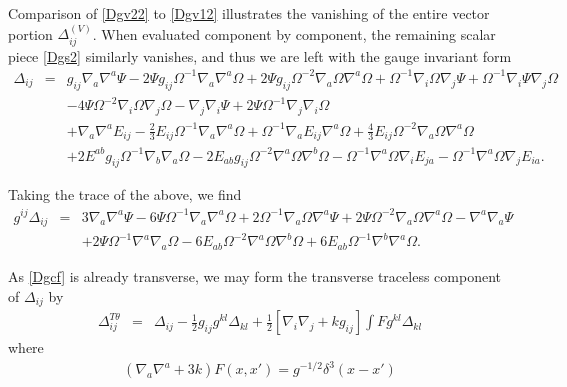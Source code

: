 \documentclass[10pt,letterpaper]{article}
\numberwithin{equation}{section}
\begin{document}
Comparison of \eqref{Dgv22} to \eqref{Dgv12} illustrates the vanishing of the entire vector portion $\Delta^{(V)}_{ij}$. When evaluated component by component, the remaining scalar piece \eqref{Dgs2} similarly vanishes, and thus we are left with the gauge invariant form
\begin{eqnarray}
\Delta_{ij}&=&g_{ij} \nabla_{a}\nabla^{a}\Psi
- 2 \Psi g_{ij} \Omega^{-1} \nabla_{a}\nabla^{a}\Omega
+ 2 \Psi g_{ij} \Omega^{-2} \nabla_{a}\Omega \nabla^{a}\Omega
+ \Omega^{-1} \nabla_{i}\Omega \nabla_{j}\Psi
+ \Omega^{-1} \nabla_{i}\Psi \nabla_{j}\Omega\nonumber\\
&& - 4 \Psi \Omega^{-2} \nabla_{i}\Omega \nabla_{j}\Omega
-  \nabla_{j}\nabla_{i}\Psi
+ 2 \Psi \Omega^{-1} \nabla_{j}\nabla_{i}\Omega
\nonumber\\
&&+\nabla_{a}\nabla^{a}E_{ij}
-  \tfrac{2}{3} E_{ij} \Omega^{-1} \nabla_{a}\nabla^{a}\Omega
+ \Omega^{-1} \nabla_{a}E_{ij} \nabla^{a}\Omega
+ \tfrac{4}{3} E_{ij} \Omega^{-2} \nabla_{a}\Omega \nabla^{a}\Omega\nonumber\\
&& + 2 E^{ab} g_{ij} \Omega^{-1} \nabla_{b}\nabla_{a}\Omega
- 2 E_{ab} g_{ij} \Omega^{-2} \nabla^{a}\Omega \nabla^{b}\Omega
-  \Omega^{-1} \nabla^{a}\Omega \nabla_{i}E_{ja}
-  \Omega^{-1} \nabla^{a}\Omega \nabla_{j}E_{ia}.
\label{Dgcf}
\end{eqnarray}

Taking the trace of the above, we find
\begin{eqnarray}
g^{ij}\Delta_{ij}&=&3 \nabla_{a}\nabla^{a}\Psi
- 6 \Psi \Omega^{-1} \nabla_{a}\nabla^{a}\Omega
+ 2 \Omega^{-1} \nabla_{a}\Omega \nabla^{a}\Psi
+ 2 \Psi \Omega^{-2} \nabla_{a}\Omega \nabla^{a}\Omega
-  \nabla^{a}\nabla_{a}\Psi\nonumber\\
&& + 2 \Psi \Omega^{-1} \nabla^{a}\nabla_{a}\Omega
- 6 E_{ab} \Omega^{-2} \nabla^{a}\Omega \nabla^{b}\Omega
+ 6 E_{ab} \Omega^{-1} \nabla^{b}\nabla^{a}\Omega.
\end{eqnarray}

As \eqref{Dgcf} is already transverse, we may form the transverse traceless component of $\Delta_{ij}$ by 
\begin{eqnarray}
 \Delta_{ij}^{T\theta} &=& \Delta_{ij} - \frac12 g_{ij} g^{kl}\Delta_{kl}+ \frac12 \left[ \nabla_i\nabla_j +kg_{ij}\right]\int F g^{kl}\Delta_{kl}
\end{eqnarray}
where 
\begin{eqnarray}
(\nabla_a\nabla^a +3k)F(x,x')= g^{-1/2}\delta^3(x-x')
\end{eqnarray}
\end{document}
